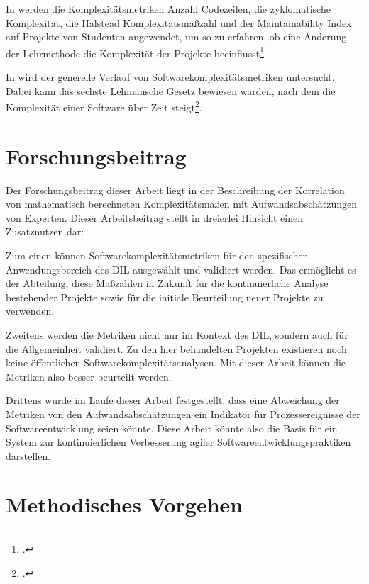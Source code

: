 In \cite[][]{rumreichExaminingSoftwareDesign2019} werden die Komplexitätsmetriken
Anzahl Codezeilen, die zyklomatische Komplexität, die Halstead
Komplexitätsma\ss zahl und der Maintainability Index auf Projekte von
Studenten angewendet, um so zu erfahren, ob eine Änderung der
Lehrmethode die Komplexität der Projekte beeinflusst\footcite[Vgl. ][S. 1]{rumreichExaminingSoftwareDesign2019}

In \cite[][]{aleneziEmpiricalAnalysisComplexity2015} wird der generelle Verlauf von
Softwarekomplexitätsmetriken untersucht. Dabei kann das sechste
Lehmansche Gesetz bewiesen warden, nach dem die Komplexität einer
Software über Zeit steigt\footcite[Vgl. ][S. 262]{aleneziEmpiricalAnalysisComplexity2015}.

\section{Forschungsbeitrag}\label{forschungsbeitrag}

Der Forschungsbeitrag dieser Arbeit liegt in der Beschreibung der
Korrelation von mathematisch berechneten Komplexitätsma\ss en mit
Aufwandsabschätzungen von Experten. Dieser Arbeitsbeitrag stellt in
dreierlei Hinsicht einen Zusatznutzen dar:

Zum einen können Softwarekomplexitätsmetriken für den spezifischen
Anwendungsbereich des DIL ausgewählt und validiert werden. Das
ermöglicht es der Abteilung, diese Ma\ss zahlen in Zukunft für die
kontinuierliche Analyse bestehender Projekte sowie für die initiale
Beurteilung neuer Projekte zu verwenden.

Zweitens werden die Metriken nicht nur im Kontext des DIL, sondern auch
für die Allgemeinheit validiert. Zu den hier behandelten Projekten
existieren noch keine öffentlichen Softwarekomplexitätsanalysen. Mit
dieser Arbeit können die Metriken also besser beurteilt werden.

Drittens wurde im Laufe dieser Arbeit festgestellt, dass eine Abweichung
der Metriken von den Aufwandsabschätzungen ein Indikator für
Prozessereignisse der Softwareentwicklung seien könnte. Diese Arbeit
könnte also die Basis für ein System zur kontinuierlichen Verbesserung
agiler Softwareentwicklungspraktiken darstellen.

\section{Methodisches Vorgehen}\label{methodisches-vorgehen}

